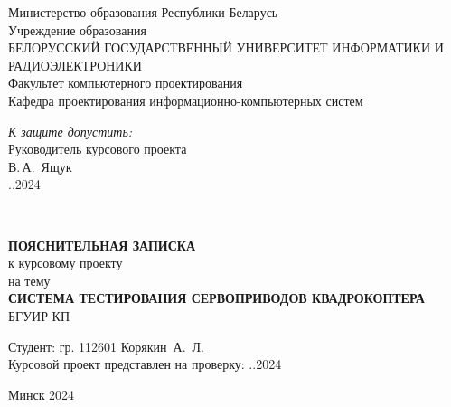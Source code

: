 
\begin{titlepage}
\begin{center}
Министерство образования Республики Беларусь\\[1.2em]
Учреждение образования\\[0.4em]
БЕЛОРУССКИЙ ГОСУДАРСТВЕННЫЙ УНИВЕРСИТЕТ ИНФОРМАТИКИ И РАДИОЭЛЕКТРОНИКИ\\[2.0em]
Факультет компьютерного проектирования\\
Кафедра проектирования информационно-компьютерных систем

\end{center}

\begin{flushright}
  \begin{minipage}{0.5\textwidth}
    \textit{К защите допустить:}\\
    Руководитель курсового проекта\\

    \underline{\hspace*{2.8cm}} В.\,А.~Ящук\\
    \underline{\hspace*{1.4cm}}.\underline{\hspace*{1.4cm}}.2024
  \end{minipage}\\[2em]
\end{flushright}

\begin{center}
  \textbf{ПОЯСНИТЕЛЬНАЯ ЗАПИСКА}\\
  к курсовому проекту\\
  на тему\\[2.0em]

  \textbf{СИСТЕМА ТЕСТИРОВАНИЯ СЕРВОПРИВОДОВ КВАДРОКОПТЕРА}\\
  БГУИР КП%
\end{center}

\begin{flushright}
    \begin{minipage}{9.3cm}
        Студент:  гр. 112601 Корякин~А.~Л.\\[0.1em]

        Курсовой проект представлен на проверку: \underline{\hspace*{1.4cm}}.\underline{\hspace*{1.4cm}}.2024\\
        \underline{\hspace*{5.6cm}}
        
    \end{minipage}
  \end{flushright}
  
  \vfill
  \begin{center}
    {\normalsize Минск 2024}
    \end{center}
\end{titlepage}
